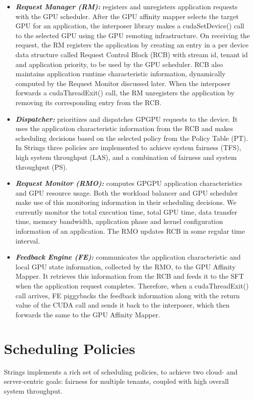 \begin{itemize}
\item \textbf{\textit{Request Manager (RM): }} registers and unregisters application requests with the GPU scheduler. After the GPU affinity mapper selects the target GPU for an application, the interposer library makes a cudaSetDevice() call to the selected GPU using the GPU remoting infrastructure. On receiving the request, the RM registers the application by creating an entry in a per device data structure called Request Control Block (RCB) with stream id, tenant id and application priority, to be used by the GPU scheduler. RCB also maintains application runtime characteristic information, dynamically computed by the Request Monitor discussed later. When the interposer forwards a cudaThreadExit() call, the RM unregisters the application by removing its corresponding entry from the RCB.
\item \textbf{\textit{Dispatcher: }}prioritizes and dispatches GPGPU requests to the device. It uses the application characteristic information from the RCB and makes scheduling decisions based on the selected policy from the Policy Table (PT). In Strings three policies are implemented to achieve system fairness (TFS), high system throughput (LAS), and a combination of fairness and system throughput (PS).
\item \textbf{\textit{Request Monitor (RMO): }}computes GPGPU application characteristics and GPU resource usage. Both the workload balancer and GPU scheduler make use of this monitoring information in their scheduling decisions. We currently monitor the total execution time, total GPU time, data transfer time, memory bandwidth, application phase and kernel configuration information of an application. The RMO updates RCB in some regular time interval.
\item \textbf{\textit{Feedback Engine (FE): }}communicates the application characteristic and local GPU state information, collected by the RMO, to the GPU Affinity Mapper. It retrieves this information from the RCB and feeds it to the SFT when the application request completes. Therefore, when a cudaThreadExit() call arrives, FE piggybacks the feedback information along with the return value of the CUDA call and sends it back to the interposer, which then forwards the same to the GPU Affinity Mapper.
\end{itemize}

\section{Scheduling Policies}
Strings  implements  a  rich  set  of  scheduling  policies,  to achieve two cloud- and server-centric goals: fairness for multiple tenants, coupled with high overall system throughput.
